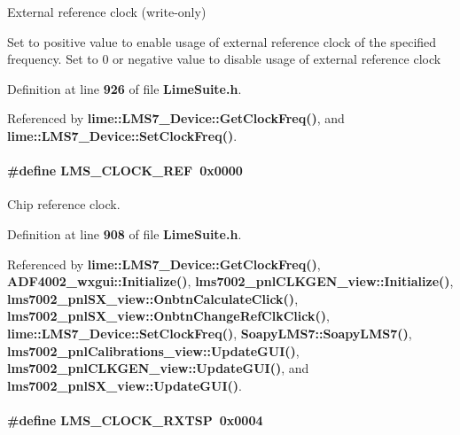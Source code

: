 External reference clock (write-\/only) 

Set to positive value to enable usage of external reference clock of the specified frequency. Set to 0 or negative value to disable usage of external reference clock 

Definition at line {\bf 926} of file {\bf Lime\+Suite.\+h}.



Referenced by {\bf lime\+::\+L\+M\+S7\+\_\+\+Device\+::\+Get\+Clock\+Freq()}, and {\bf lime\+::\+L\+M\+S7\+\_\+\+Device\+::\+Set\+Clock\+Freq()}.

\paragraph[{L\+M\+S\+\_\+\+C\+L\+O\+C\+K\+\_\+\+R\+EF}]{\setlength{\rightskip}{0pt plus 5cm}\#define L\+M\+S\+\_\+\+C\+L\+O\+C\+K\+\_\+\+R\+EF~0x0000}\label{group__LMS__CLOCK__ID_gac8b3ef2e4025803fbf22dba4144d77b2}


Chip reference clock. 



Definition at line {\bf 908} of file {\bf Lime\+Suite.\+h}.



Referenced by {\bf lime\+::\+L\+M\+S7\+\_\+\+Device\+::\+Get\+Clock\+Freq()}, {\bf A\+D\+F4002\+\_\+wxgui\+::\+Initialize()}, {\bf lms7002\+\_\+pnl\+C\+L\+K\+G\+E\+N\+\_\+view\+::\+Initialize()}, {\bf lms7002\+\_\+pnl\+S\+X\+\_\+view\+::\+Onbtn\+Calculate\+Click()}, {\bf lms7002\+\_\+pnl\+S\+X\+\_\+view\+::\+Onbtn\+Change\+Ref\+Clk\+Click()}, {\bf lime\+::\+L\+M\+S7\+\_\+\+Device\+::\+Set\+Clock\+Freq()}, {\bf Soapy\+L\+M\+S7\+::\+Soapy\+L\+M\+S7()}, {\bf lms7002\+\_\+pnl\+Calibrations\+\_\+view\+::\+Update\+G\+U\+I()}, {\bf lms7002\+\_\+pnl\+C\+L\+K\+G\+E\+N\+\_\+view\+::\+Update\+G\+U\+I()}, and {\bf lms7002\+\_\+pnl\+S\+X\+\_\+view\+::\+Update\+G\+U\+I()}.

\paragraph[{L\+M\+S\+\_\+\+C\+L\+O\+C\+K\+\_\+\+R\+X\+T\+SP}]{\setlength{\rightskip}{0pt plus 5cm}\#define L\+M\+S\+\_\+\+C\+L\+O\+C\+K\+\_\+\+R\+X\+T\+SP~0x0004}\label{group__LMS__CLOCK__ID_gae3b0ed66bdc27949dfe0c4a860da7d01}



